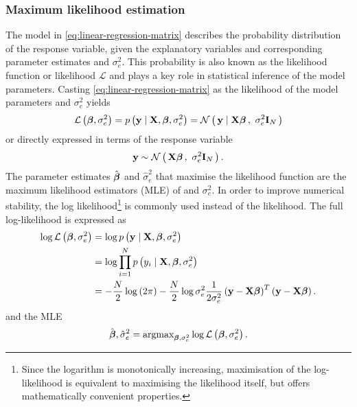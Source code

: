 \subsubsection{Maximum likelihood estimation}
The model in \cref{eq:linear-regression-matrix} describes the probability distribution of the response variable, given the explanatory variables and corresponding parameter estimates \tmat{\beta} and \(\sigma^2_e\). This probability is also known as the likelihood function or likelihood \(\mathcal{L}\) and plays a key role in statistical inference of the model parameters. Casting \cref{eq:linear-regression-matrix} as the likelihood of the model parameters  \tmat{\beta} and \(\sigma^2_e\) yields 
\begin{equation}
\mathcal{L} \left( \boldsymbol{\mathbf{\beta}}, \sigma^2_e \right) = p \left(\boldsymbol{\mathbf{y}} \mid \boldsymbol{\mathbf{X}}, \boldsymbol{\mathbf{\beta}}, \sigma^2_e \right) = \mathcal{N}\left(\,{\boldsymbol{\mathbf{y}} \mid \boldsymbol{\mathbf{X}}\boldsymbol{\mathbf{\beta}}}\,,~{\sigma^2_e\boldsymbol{\mathbf{I}}_{N}}\,\right)
\end{equation}
%
or directly expressed in terms of the response variable
\begin{equation}
\label{eq:normal-matrix}
\boldsymbol{\mathbf{y}} \sim \mathcal{N}\left(\,{\boldsymbol{\mathbf{X}}\boldsymbol{\mathbf{\beta}}}\,,~{\sigma^2_e\boldsymbol{\mathbf{I}}_{N}}\,\right).
\end{equation}
%
The parameter estimates \(\hat{\boldsymbol{\mathbf{\beta}}}\) and \(\hat{\sigma}^2_e\) that maximise the likelihood function are the maximum likelihood estimators (MLE) of \tmat{\beta} and \(\sigma^2_e\). In order to improve numerical stability, the log likelihood\footnote{Since the logarithm is monotonically increasing, maximisation of the log-likelihood is equivalent to maximising the likelihood itself, but offers mathematically convenient properties.} is commonly used instead of the likelihood. The full log-likelihood is expressed as
%
\begin{align}
\log\mathcal{L} \left( \boldsymbol{\mathbf{\beta}}, \sigma^2_e \right) & = \log p \left(\boldsymbol{\mathbf{y}} \mid \boldsymbol{\mathbf{X}}, \boldsymbol{\mathbf{\beta}}, \sigma^2_e \right) \\
& = \log \prod^N_{i=1} p \left(y_i \mid \boldsymbol{\mathbf{X}}, \boldsymbol{\mathbf{\beta}}, \sigma^2_e \right) \\
& =  -\frac{N}{2}\log\left(2\pi\right) - \frac{N}{2}\log\sigma^2_e  \frac{1}{2\sigma^2_e } \left(\boldsymbol{\mathbf{y}} - \boldsymbol{\mathbf{X}}\boldsymbol{\mathbf{\beta}}\right)^T  \left(\boldsymbol{\mathbf{y}} - \boldsymbol{\mathbf{X}}\boldsymbol{\mathbf{\beta}}\right).
\label{eq:log-likelihood}
\end{align}
%
and the MLE
%
\begin{equation}
\hat{\boldsymbol{\mathbf{\beta}}},\hat{\sigma}^2_e = \text{argmax}_{\boldsymbol{\mathbf{\beta}},\sigma^2_e} \log\mathcal{L}\left(\boldsymbol{\mathbf{\beta}},\sigma^2_e\right).
\label{eq:argmax-log}
\end{equation}
